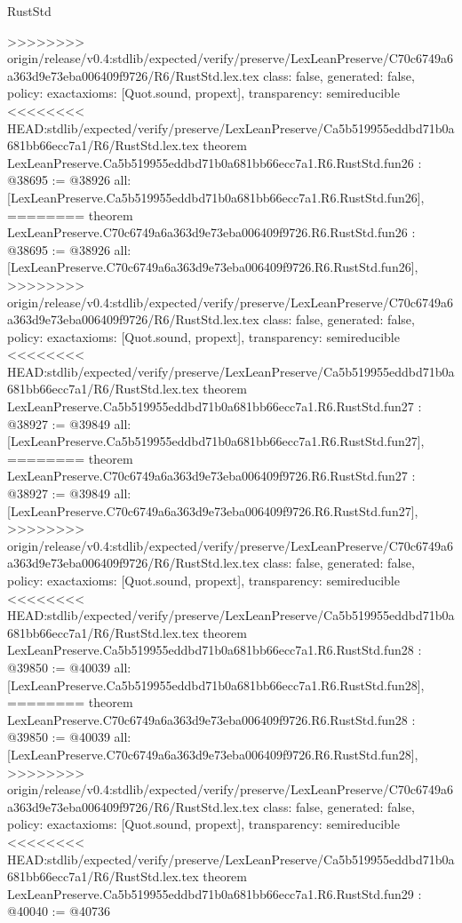 \begin{lexlean}{RustStd}
\begin{coremodule}
{\begin{coremodule}
{{{{{{{{{{{{{{{{{{{{{{{{{{{{{>>>>>>>> origin/release/v0.4:stdlib/expected/verify/preserve/LexLeanPreserve/C70c6749a6a363d9e73eba006409f9726/R6/RustStd.lex.tex
  class: false,
  generated: false,
  policy: exact{axioms: [Quot.sound, propext]},
  transparency: semireducible
}
<<<<<<<< HEAD:stdlib/expected/verify/preserve/LexLeanPreserve/Ca5b519955eddbd71b0a681bb66ecc7a1/R6/RustStd.lex.tex
theorem LexLeanPreserve.Ca5b519955eddbd71b0a681bb66ecc7a1.R6.RustStd.fun26 : @38695 := @38926 {
  all: [LexLeanPreserve.Ca5b519955eddbd71b0a681bb66ecc7a1.R6.RustStd.fun26],
========
theorem LexLeanPreserve.C70c6749a6a363d9e73eba006409f9726.R6.RustStd.fun26 : @38695 := @38926 {
  all: [LexLeanPreserve.C70c6749a6a363d9e73eba006409f9726.R6.RustStd.fun26],
>>>>>>>> origin/release/v0.4:stdlib/expected/verify/preserve/LexLeanPreserve/C70c6749a6a363d9e73eba006409f9726/R6/RustStd.lex.tex
  class: false,
  generated: false,
  policy: exact{axioms: [Quot.sound, propext]},
  transparency: semireducible
}
<<<<<<<< HEAD:stdlib/expected/verify/preserve/LexLeanPreserve/Ca5b519955eddbd71b0a681bb66ecc7a1/R6/RustStd.lex.tex
theorem LexLeanPreserve.Ca5b519955eddbd71b0a681bb66ecc7a1.R6.RustStd.fun27 : @38927 := @39849 {
  all: [LexLeanPreserve.Ca5b519955eddbd71b0a681bb66ecc7a1.R6.RustStd.fun27],
========
theorem LexLeanPreserve.C70c6749a6a363d9e73eba006409f9726.R6.RustStd.fun27 : @38927 := @39849 {
  all: [LexLeanPreserve.C70c6749a6a363d9e73eba006409f9726.R6.RustStd.fun27],
>>>>>>>> origin/release/v0.4:stdlib/expected/verify/preserve/LexLeanPreserve/C70c6749a6a363d9e73eba006409f9726/R6/RustStd.lex.tex
  class: false,
  generated: false,
  policy: exact{axioms: [Quot.sound, propext]},
  transparency: semireducible
}
<<<<<<<< HEAD:stdlib/expected/verify/preserve/LexLeanPreserve/Ca5b519955eddbd71b0a681bb66ecc7a1/R6/RustStd.lex.tex
theorem LexLeanPreserve.Ca5b519955eddbd71b0a681bb66ecc7a1.R6.RustStd.fun28 : @39850 := @40039 {
  all: [LexLeanPreserve.Ca5b519955eddbd71b0a681bb66ecc7a1.R6.RustStd.fun28],
========
theorem LexLeanPreserve.C70c6749a6a363d9e73eba006409f9726.R6.RustStd.fun28 : @39850 := @40039 {
  all: [LexLeanPreserve.C70c6749a6a363d9e73eba006409f9726.R6.RustStd.fun28],
>>>>>>>> origin/release/v0.4:stdlib/expected/verify/preserve/LexLeanPreserve/C70c6749a6a363d9e73eba006409f9726/R6/RustStd.lex.tex
  class: false,
  generated: false,
  policy: exact{axioms: [Quot.sound, propext]},
  transparency: semireducible
}
<<<<<<<< HEAD:stdlib/expected/verify/preserve/LexLeanPreserve/Ca5b519955eddbd71b0a681bb66ecc7a1/R6/RustStd.lex.tex
theorem LexLeanPreserve.Ca5b519955eddbd71b0a681bb66ecc7a1.R6.RustStd.fun29 : @40040 := @40736 {
}}}}}}}}}}}}}}}}}}}}}}}}}}}}}}}}
\end{coremodule}}
\end{coremodule}
\end{lexlean}
